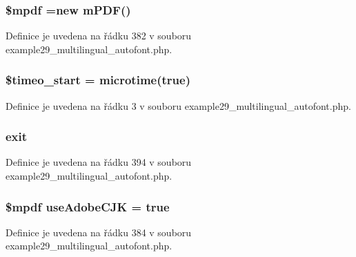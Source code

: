 \hypertarget{example29__multilingual__autofont_8php_ad028f81910d6cbab9b184d2214b3a8f8}{
\subsubsection[{\$mpdf}]{\setlength{\rightskip}{0pt plus 5cm}\$mpdf =new {\bf m\-P\-D\-F}()}}\label{example29__multilingual__autofont_8php_ad028f81910d6cbab9b184d2214b3a8f8}


Definice je uvedena na řádku 382 v souboru example29\-\_\-multilingual\-\_\-autofont.\-php.

\hypertarget{example29__multilingual__autofont_8php_a06f35b7921fa102646070c194d147feb}{
\subsubsection[{\$timeo\-\_\-start}]{\setlength{\rightskip}{0pt plus 5cm}\$timeo\-\_\-start = microtime(true)}}\label{example29__multilingual__autofont_8php_a06f35b7921fa102646070c194d147feb}


Definice je uvedena na řádku 3 v souboru example29\-\_\-multilingual\-\_\-autofont.\-php.

\hypertarget{example29__multilingual__autofont_8php_a6733eb5f605d09eaede9845835d71c4e}{
\subsubsection[{exit}]{\setlength{\rightskip}{0pt plus 5cm}exit}}\label{example29__multilingual__autofont_8php_a6733eb5f605d09eaede9845835d71c4e}


Definice je uvedena na řádku 394 v souboru example29\-\_\-multilingual\-\_\-autofont.\-php.

\hypertarget{example29__multilingual__autofont_8php_a9986e85eaef973df9d3fea85016c75a7}{
\subsubsection[{use\-Adobe\-C\-J\-K}]{\setlength{\rightskip}{0pt plus 5cm}\$mpdf use\-Adobe\-C\-J\-K = true}}\label{example29__multilingual__autofont_8php_a9986e85eaef973df9d3fea85016c75a7}


Definice je uvedena na řádku 384 v souboru example29\-\_\-multilingual\-\_\-autofont.\-php.

